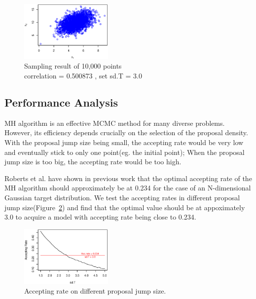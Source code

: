 \begin{figure}[t]
\vspace{-0.5in}
  	\centering
  	\includegraphics[width=0.4\textwidth]{figure/sample_result.eps}
\vspace{-0.2in}
	\caption{Sampling result of 10,000 points \protect\\ correlation = 0.500873 , set sd.T = 3.0}
	\label{fig:sample_result}
\end{figure}


\subsection{Performance Analysis}
MH algorithm is an effective MCMC method for many diverse problems. However, its efficiency depends crucially on the selection of the proposal density. With the proposal jump size being small, the accepting rate would be very low and eventually stick to only one point(eg. the initial point); When the proposal jump size is too big, the accepting rate would be too high. 

Roberts et al. have shown in previous work\cite{roberts1997weak} that the optimal accepting rate of the MH algorithm should approximately be at 0.234 for the case of an N-dimensional Gaussian target distribution. We test the accepting rates in different proposal jump size(Figure~\ref{fig:acc_sdt}) and find that the optimal value should be at appoximately 3.0 to acquire a model with accepting rate being close to 0.234.

\begin{figure}[t]
\vspace{-0.5in}
  	\centering
  	\includegraphics[width=0.4\textwidth]{figure/acc_sdt.eps}
\vspace{-0.2in}
	\caption{Accepting rate on different proposal jump size.}
	\label{fig:acc_sdt}
\end{figure}

